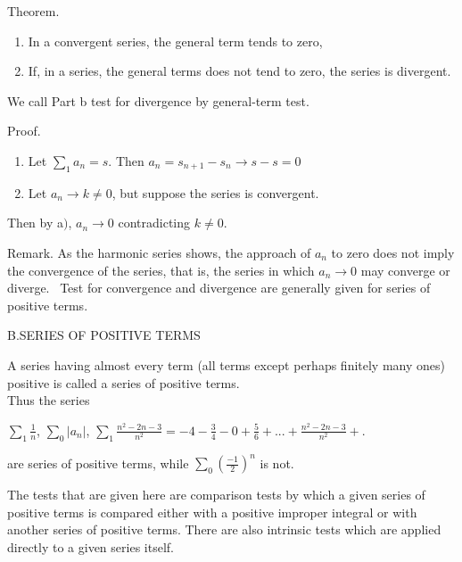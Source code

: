 \documentclass[11pt]{amsbook}
\begin{document}

Theorem.

\renewcommand{\labelenumi}{\alph{enumi})}
\begin{enumerate}
\item In a convergent series, the general term tends to zero, 
\item If, in a series, the general terms does not tend to zero, the series is divergent.

\end{enumerate}

We call Part b test for divergence by general-term test.


Proof.
\renewcommand{\labelenumi}{\alph{enumi})}
\begin{enumerate}
\item Let $\sum_{1} a_{n} = s$. Then $a_{n} = s_{n+1} - s_{n} \rightarrow s - s = 0$
\item Let $a_{n} \rightarrow k\neq 0$, but suppose the series is convergent. 

\end{enumerate}
Then by a$)$, $a_{n} \rightarrow 0$ contradicting $k\neq 0$.


Remark. As the harmonic series shows, the approach of $a_{n}$ to zero does not imply the convergence of the series, that is, the series in which $a_{n} \rightarrow 0$ may converge or diverge.
\
Test for convergence and divergence are generally given for series of positive terms.

B.SERIES OF POSITIVE TERMS

A series having almost every term (all terms except perhaps finitely many ones) positive is called a series of positive terms.
\\
Thus the series 

\begin{center}
$\sum_{1}\frac{1}{n}$, $\sum_{0}\left | a_{n} \right |$, $\sum_{1}\frac{n^{2} - 2n - 3}{n^{2}} = - 4  - \frac{3}{4} - 0  + \frac{5}{6} + ... + \frac{n^{2} - 2n - 3}{n^{2}} + .$
\end{center}
are series of positive terms, while $ \sum_{0}\left ( \frac{-1}{2} \right )^{n} $ is not.

The tests that are given here are comparison tests by which a given series of positive terms is compared either with a positive improper integral or with another series of positive terms. There are also intrinsic tests which are applied directly to a given series itself.
\end{document}
